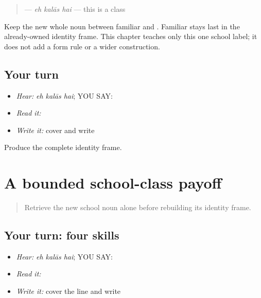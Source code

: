 \begin{grammarlens}[title={Grammar Lens}]
\begin{quote}
\textbf{  } — \emph{eh kalās hai} — this is a class
\end{quote}

Keep the new whole noun between familiar \textbf{} and \textbf{}. Familiar \textbf{} stays last in the already-owned identity frame. This chapter teaches only this one school label; it does not add a form rule or a wider construction.
\end{grammarlens}

\subsection*{Your turn}
\begin{itemize}
\raggedright
  \item \emph{Hear:} \emph{eh kalās hai}; YOU SAY: \textbf{  }
  \item \emph{Read it:} \textbf{  }
  \item \emph{Write it:} cover and write \textbf{  }
\end{itemize}

\begin{tcolorbox}[breakable,colback=teal!4,colframe=teal!35!black,title={Before you move on}]
Produce the complete identity frame.
\end{tcolorbox}
\section[\texorpdfstring{\pa{ਇਹ} \pa{ਕਲਾਸ} \pa{ਹੈ} (eh kalaas hai)}{ਇਹ ਕਲਾਸ ਹੈ (eh kalaas hai)}]{A bounded school-class payoff}

\label{lesson:PA-C201-payoff}



\begin{quote}
Retrieve the new school noun alone before rebuilding its identity frame.
\end{quote}

\subsection*{Your turn: four skills}
\begin{itemize}
\raggedright
  \item \emph{Hear:} \emph{eh kalās hai}; YOU SAY: \textbf{  }
  \item \emph{Read it:} \textbf{  }
  \item \emph{Write it:} cover the line and write \textbf{  }
\end{itemize}

